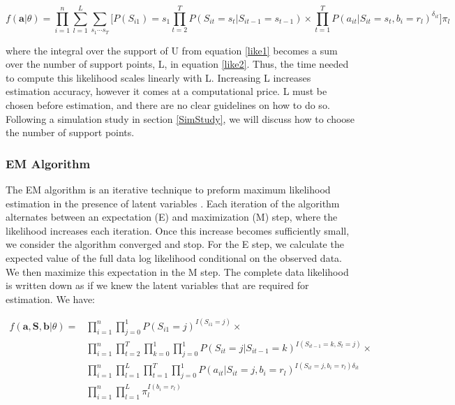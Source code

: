 \documentclass{article}
\begin{document}
\begin{equation}\label{like2}
f(\textbf{a}|\theta) = \prod_{i=1}^n \sum_{l=1}^L \sum_{{s_1}\cdots{s_T}} \biggr[ 
    P(S_{i1})=s_1\prod_{t=2}^T P(S_{it}=s_t|S_{it-1}=s_{t-1}) \times 
    \prod_{t=1}^T P(a_{it}|S_{it}=s_t,b_i=r_l)^{\delta_{it}} \biggr] \pi_l
\end{equation}

where the integral over the support of U from equation \ref{like1} becomes a sum over the number of support points, L, in equation \ref{like2}. Thus, the time needed to compute this likelihood scales linearly with L. Increasing L increases estimation accuracy, however it comes at a computational price. L must be chosen before estimation, and there are no clear guidelines on how to do so. Following a simulation study in section \ref{SimStudy}, we will discuss how to choose the number of support points.

\subsubsection{EM Algorithm}

The EM algorithm is an iterative technique to preform maximum likelihood estimation in the presence of latent variables \cite{Baum1970}. Each iteration of the algorithm alternates between an expectation (E) and maximization (M) step, where the likelihood increases each iteration. Once this increase becomes sufficiently small, we consider the algorithm converged and stop. For the E step, we calculate the expected value of the full data log likelihood conditional on the observed data. We then maximize this expectation in the M step. The complete data likelihood is written down as if we knew the latent variables that are required for estimation. We have: 

\begin{equation}\label{cdata}
\begin{split}
    f(\textbf{a},\textbf{S}, \textbf{b} | \theta)  = & \prod_{i=1}^n \prod_{j=0}^1 
        P(S_{i1}=j)^{I(S_{i1}=j)} \times \\
    & \prod_{i=1}^n \prod^T_{t=2} \prod_{k=0}^1 \prod_{j=0}^1  
        P(S_{it}=j|S_{it-1}=k)^{I(S_{it-1}=k,S_{t}=j)} \times \\ 
    & \prod_{i=1}^n\prod_{l=1}^L \prod^T_{t=1}\prod_{j=0}^1 
        P(a_{it}|S_{it}=j,b_i=r_l)^{I(S_{it}=j,b_i=r_l)\delta_{it}}\\
    & \prod_{i=1}^n\prod_{l=1}^L \pi_l^{I(b_i=r_l)}
\end{split}
\end{equation}
\end{document}
